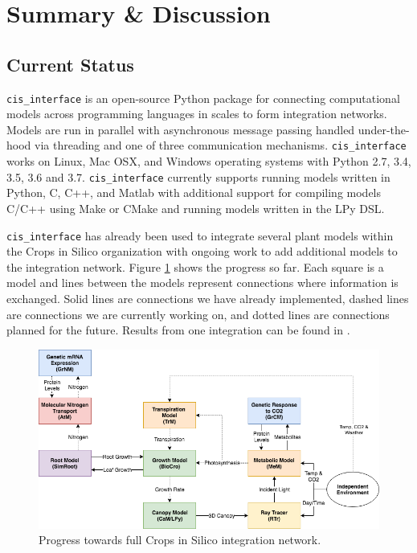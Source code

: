 \documentclass[journal]{IEEEtran}
\newcommand{\todo}[1]{{\color{red}{#1}}}
\newcommand{\cis}{{\tt cis\_interface}{}}
\begin{document}
\section{Summary \& Discussion}\label{S:discuss}

\subsection{Current Status}\label{SS:current}
%
{\cis} is an open-source Python package for connecting computational models across programming languages in scales to form integration networks. Models are run in parallel with asynchronous message passing handled under-the-hood via threading and one of three communication mechanisms. {\cis} works on Linux, Mac OSX, and Windows operating systems with Python 2.7, 3.4, 3.5, 3.6 and 3.7. {\cis} currently supports running models written in Python, C, C++, and Matlab with additional support for compiling models C/C++ using Make \citep{Stallman2004} or CMake \citep{Martin2006} and running models written in the LPy \citep{Boudon2012} DSL.

{\cis} has already been used to integrate several plant models within the Crops in Silico organization with ongoing work to add additional models to the integration network. Figure \ref{fig:network} shows the progress so far. Each square is a model and lines between the models represent connections where information is exchanged. Solid lines are connections we have already implemented, dashed lines are connections we are currently working on, and dotted lines are connections planned for the future. Results from one integration can be found in \todo{cite Kavya/Yu}.
%
\ifinclfig
 	\begin{figure}[htbp]
	\begin{center}
	\includegraphics[width=\columnwidth,keepaspectratio]{./images/CiS-BioCro-Planned.png}
	\caption{Progress towards full Crops in Silico integration network.}
	\label{fig:network}
	\end{center}
	\end{figure}
\fi
%
\todo{more here? teaser results?}
\end{document}
